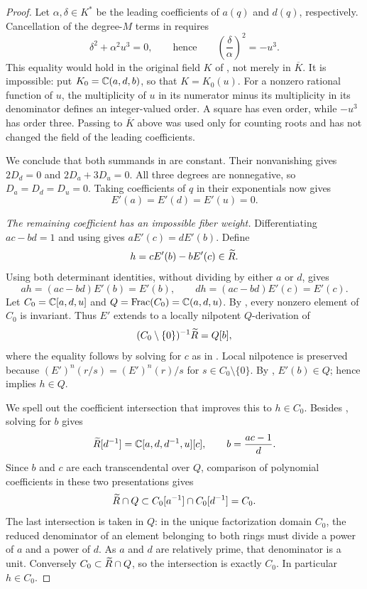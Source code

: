 \begin{proof}
Let $\alpha,\delta\in K^*$ be the leading coefficients of
$a(q)$ and $d(q)$, respectively.  Cancellation of the
degree-$M$ terms in  requires
\[
 \delta^2+\alpha^2u^3=0,
 \qquad\text{hence}\qquad
 \left(\frac{\delta}{\alpha}\right)^2=-u^3.
\]
This equality would hold in the original field $K$ of
, not merely in $\overline K$.
It is impossible: put $K_0=\mathbb C(a,d,b)$, so that $K=K_0(u)$.
For a nonzero rational function of $u$, the multiplicity of $u$
in its numerator minus its multiplicity in its denominator
defines an integer-valued order.  A square has even order,
while $-u^3$ has order three.  Passing to $\overline K$ above
was used only for counting roots and has not changed the field
of the leading coefficients.

We conclude that both summands in  are
constant.  Their nonvanishing gives $2D_d=0$ and
$2D_a+3D_u=0$.  All three degrees are nonnegative, so
$D_a=D_d=D_u=0$.  Taking coefficients of $q$ in their
exponentials now gives
\begin{equation}\label{rig:fixed-coefficients}
 E'(a)=E'(d)=E'(u)=0.
\end{equation}

\medskip\noindent
\emph{The remaining coefficient has an impossible fiber weight.}
Differentiating $ac-bd=1$ and using
 gives $aE'(c)=dE'(b)$.  Define
\[
 h=cE'(b)-bE'(c)\in\widetilde R.
\]
Using both determinant identities, without dividing by either
$a$ or $d$, gives
\begin{equation}\label{rig:h-formulas}
 a h=(ac-bd)E'(b)=E'(b),\qquad
 d h=(ac-bd)E'(c)=E'(c).
\end{equation}
Let $C_0=\mathbb C[a,d,u]$ and $Q=\operatorname{Frac}(C_0)=\mathbb C(a,d,u)$.
By , every nonzero element of
$C_0$ is invariant.  Thus $E'$ extends to a locally nilpotent
$Q$-derivation of
\[
 (C_0\setminus\{0\})^{-1}\widetilde R=Q[b],
\]
where the equality follows by solving for $c$ as in
.  Local nilpotence is preserved because
$(E')^n(r/s)=(E')^n(r)/s$ for $s\in C_0\setminus\{0\}$.
By , $E'(b)\in Q$; hence
 implies $h\in Q$.

We spell out the coefficient intersection that improves this
to $h\in C_0$.  Besides , solving for $b$
gives
\[
 \widetilde R[d^{-1}]=\mathbb C[a,d,d^{-1},u][c],
 \qquad b=\frac{ac-1}{d}.
\]
Since $b$ and $c$ are each transcendental over $Q$, comparison
of polynomial coefficients in these two presentations gives
\[
 \widetilde R\cap Q
 \subset C_0[a^{-1}]\cap C_0[d^{-1}]
 =C_0.
\]
The last intersection is taken in $Q$: in the unique
factorization domain $C_0$, the reduced denominator of an
element belonging to both rings must divide a power of $a$
and a power of $d$.  As $a$ and $d$ are relatively prime, that
denominator is a unit.  Conversely $C_0\subset\widetilde R\cap Q$, so
the intersection is exactly $C_0$.  In particular $h\in C_0$.


\end{proof}
